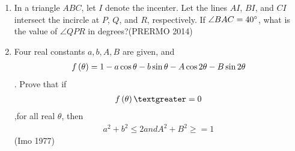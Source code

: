 \begin{enumerate}
\item In a triangle $ABC$, let $I$ denote the incenter. Let the lines $AI$, $BI$, and $CI$ intersect the incircle at $P$, $Q$, and $R$, respectively. If $\angle BAC = 40\degree$, what is the value of $\angle QPR$ in degrees?\hfill(PRERMO 2014)
\item Four real constants $a, b, A, B$ are given, and \begin{align}
f\left(\theta\right) = 1 - a\cos\theta - b \sin \theta     - A \cos 2\theta - B \sin 2\theta  
\end{align}. Prove that if 
\begin{align}f\brak{\theta} \textgreater= 0 
	\end{align} ,for all real $\theta$, then
\begin{align} a^{2} + b^{2} \leq 2 and A^{2} + B^{2} \geq = 1 
\end{align}\hfill(Imo 1977)

		
	

\end{enumerate}
